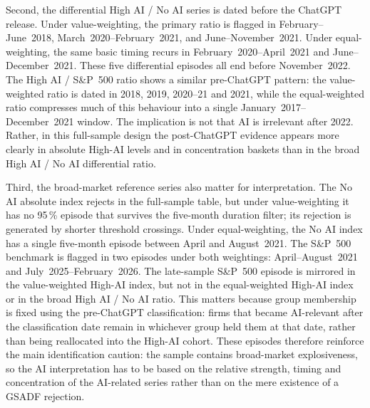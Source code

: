 Second, the differential High AI / No AI series is dated before the ChatGPT release. Under value-weighting, the primary ratio is flagged in February--June~2018, March~2020--February~2021, and June--November~2021. Under equal-weighting, the same basic timing recurs in February~2020--April~2021 and June--December~2021. These five differential episodes all end before November~2022. The High AI / S\&P~500 ratio shows a similar pre-ChatGPT pattern: the value-weighted ratio is dated in 2018, 2019, 2020--21 and 2021, while the equal-weighted ratio compresses much of this behaviour into a single January~2017--December~2021 window. The implication is not that AI is irrelevant after 2022. Rather, in this full-sample design the post-ChatGPT evidence appears more clearly in absolute High-AI levels and in concentration baskets than in the broad High AI / No AI differential ratio.
 
Third, the broad-market reference series also matter for interpretation. The No AI absolute index rejects in the full-sample table, but under value-weighting it has no 95\,\% episode that survives the five-month duration filter; its rejection is generated by shorter threshold crossings. Under equal-weighting, the No AI index has a single five-month episode between April and August~2021. The S\&P~500 benchmark is flagged in two episodes under both weightings: April--August~2021 and July~2025--February~2026. The late-sample S\&P~500 episode is mirrored in the value-weighted High-AI index, but not in the equal-weighted High-AI index or in the broad High AI / No AI ratio. This matters because group membership is fixed using the pre-ChatGPT classification: firms that became AI-relevant after the classification date remain in whichever group held them at that date, rather than being reallocated into the High-AI cohort. These episodes therefore reinforce the main identification caution: the sample contains broad-market explosiveness, so the AI interpretation has to be based on the relative strength, timing and concentration of the AI-related series rather than on the mere existence of a GSADF rejection.
 
